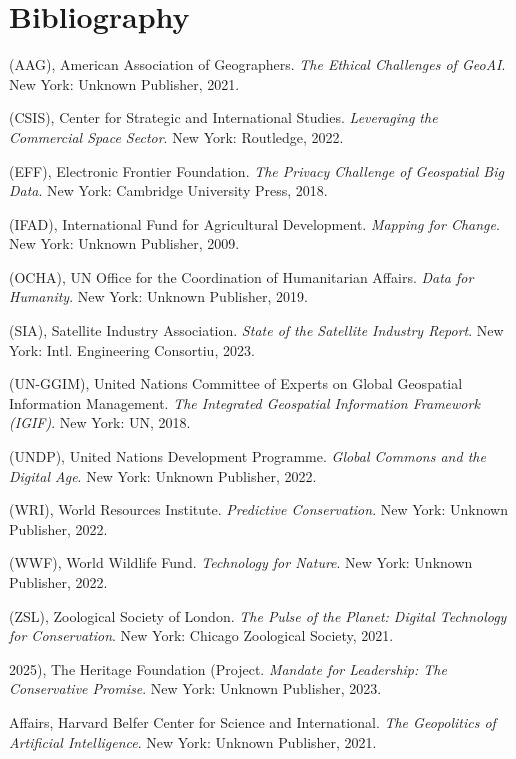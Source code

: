 \chapter*{Bibliography}

\begin{hangparas}{0.15in}{1}
\setlength{\parskip}{6pt}

(AAG), American Association of Geographers. \t\textit{The Ethical Challenges of GeoAI}. New York: Unknown Publisher, 2021.

(CSIS), Center for Strategic and International Studies. \t\textit{Leveraging the Commercial Space Sector}. New York: Routledge, 2022.

(EFF), Electronic Frontier Foundation. \t\textit{The Privacy Challenge of Geospatial Big Data}. New York: Cambridge University Press, 2018.

(IFAD), International Fund for Agricultural Development. \t\textit{Mapping for Change}. New York: Unknown Publisher, 2009.

(OCHA), UN Office for the Coordination of Humanitarian Affairs. \t\textit{Data for Humanity}. New York: Unknown Publisher, 2019.

(SIA), Satellite Industry Association. \t\textit{State of the Satellite Industry Report}. New York: Intl. Engineering Consortiu, 2023.

(UN-GGIM), United Nations Committee of Experts on Global Geospatial Information Management. \t\textit{The Integrated Geospatial Information Framework (IGIF)}. New York: UN, 2018.

(UNDP), United Nations Development Programme. \t\textit{Global Commons and the Digital Age}. New York: Unknown Publisher, 2022.

(WRI), World Resources Institute. \t\textit{Predictive Conservation}. New York: Unknown Publisher, 2022.

(WWF), World Wildlife Fund. \t\textit{Technology for Nature}. New York: Unknown Publisher, 2022.

(ZSL), Zoological Society of London. \t\textit{The Pulse of the Planet: Digital Technology for Conservation}. New York: Chicago Zoological Society, 2021.

2025), The Heritage Foundation (Project. \t\textit{Mandate for Leadership: The Conservative Promise}. New York: Unknown Publisher, 2023.

Affairs, Harvard Belfer Center for Science and International. \t\textit{The Geopolitics of Artificial Intelligence}. New York: Unknown Publisher, 2021.


\end{hangparas}
